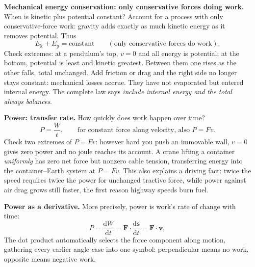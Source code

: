 \begin{center}
\end{center}

\textbf{Mechanical energy conservation: only conservative forces doing work.} When is kinetic plus potential constant? Account for a process with only conservative-force work: gravity adds exactly as much kinetic energy as it removes potential. Thus
\[
E_{\mathrm k}+E_{\mathrm p}=\text{constant}\qquad(\text{only conservative forces do work}) .
\]
Check extremes: at a pendulum's top, \(v=0\) and all energy is potential; at the bottom, potential is least and kinetic greatest. Between them one rises as the other falls, total unchanged. Add friction or drag and the right side no longer stays constant: mechanical losses accrue. They have not evaporated but entered internal energy. The complete law says \emph{include internal energy and the total always balances}.

\textbf{Power: transfer rate.} How quickly does work happen over time?
\[
P=\frac{W}{t},\qquad\text{for constant force along velocity, also }P=Fv .
\]
Check two extremes of \(P=Fv\): however hard you push an immovable wall, \(v=0\) gives zero power and no joule reaches its account. A crane lifting a container \emph{uniformly} has zero net force but nonzero cable tension, transferring energy into the container--Earth system at \(P=Fv\). This also explains a driving fact: twice the speed requires twice the power for unchanged tractive force, while power against air drag grows still faster, the first reason highway speeds burn fuel.

\begin{mathbridge}
\textbf{Power as a derivative.} More precisely, power is work's rate of change with time:
\[
P=\frac{\mathrm dW}{\mathrm dt}=\mathbf F\cdot\frac{\mathrm d\mathbf s}{\mathrm dt}=\mathbf F\cdot\mathbf v ,
\]
The dot product automatically selects the force component along motion, gathering every earlier angle case into one symbol: perpendicular means no work, opposite means negative work.
\end{mathbridge}

